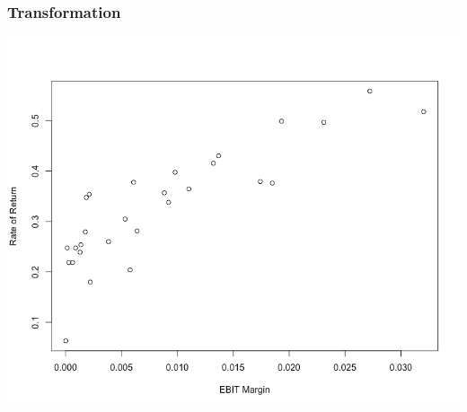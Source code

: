 \documentclass[12pt]{beamer}
\begin{document}
\begin{frame}
\frametitle{Transformation}
\begin{center}
\includegraphics[scale=0.3]{pic13.png}
\end{center}
\end{frame}
\end{document}
